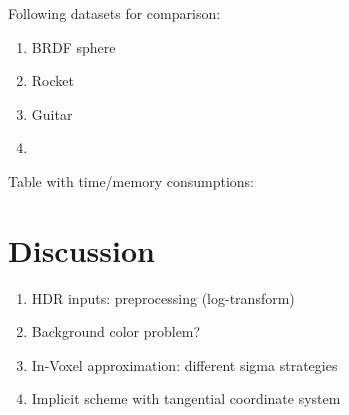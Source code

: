 

Following datasets for comparison:
\begin{enumerate}
    \item BRDF sphere
    \item Rocket
    \item Guitar
    \item \color{orange}{Trophy/donut/tablelamp}
\end{enumerate}



Table with time/memory consumptions:



\section{Discussion}

\begin{enumerate}
    \item HDR inputs: preprocessing (log-transform)
    \item Background color problem?
    \item In-Voxel approximation: different sigma strategies
    \item Implicit scheme with tangential coordinate system
\end{enumerate}





